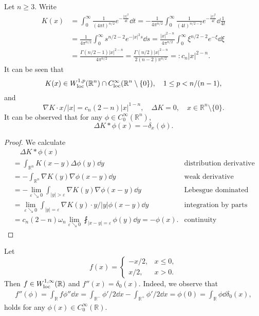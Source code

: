 \begin{proposition}
  Let $n\geq3$. 
  Write
  \begin{align*}
    K(x) &= \int_0^\infty\frac{1}{(4\pi t)^{n/2}}e^{-\frac{|x|^2}{4t}}\dd t 
    = - \frac{1}{4\pi^{n/2}}\int_0^\infty\frac{1}{(4t)^{n/2-2}}e^{-\frac{|x|^2}{4t}}\dd\frac1{4t}\\
    &= \frac1{4\pi^{n/2}}\int_0^\infty s^{n/2-2}e^{-|x|^2s}\dd s
    = \frac{|x|^{2-n}}{4\pi^{n/2}}\int_0^\infty \xi^{n/2-2}e^{-\xi}\dd\xi \\
    &= \frac{\Gamma(n/2-1)|x|^{2-n}}{4\pi^{n/2}} = \frac{\Gamma(n/2)|x|^{2-n}}{2(n-2)\pi^{n/2}} =: c_n|x|^{2-n}.
  \end{align*}
  It can be seen that 
  \[
  K(x) \in W_{\operatorname*{loc}}^{1,p}(\mathbb R^n)\cap C_{\operatorname*{loc}}^\infty(\mathbb R^n\setminus \{0\}),
  \quad 1\leq p < n/(n-1),
  \]
  and 
  \[
  \nabla K\cdot x/|x| = c_n(2-n)|x|^{1-n},\quad \Delta K = 0, \quad x\in  \mathbb R^n\setminus\{0\}.
  \]
  It can be observed that for any $\phi\in C_0^\infty(\mathbb R^n)$,
  \[
  \Delta K*\phi (x) = -\delta_x(\phi).
  \]
\end{proposition}

\begin{proof}
  We calculate 
  \begin{align*}
    &\quad\Delta K*\phi(x)\\
    &= \int_{\mathbb R^n}K(x-y)\Delta\phi(y)\dd y & \text{distribution derivative}\\ 
    &= -\int_{\mathbb R^n}\nabla K(y)\nabla\phi(x-y)\dd y
    & \text{weak derivative}\\
    &= - \lim_{\varepsilon\searrow0}\int_{|y|>\varepsilon}\nabla K(y)\nabla \phi(x-y)\dd y
    & \text{Lebesgue dominated convergence theorem}\\
    &= \lim_{\varepsilon\searrow0}\int_{|y|=\varepsilon}\nabla K(y)\cdot y/|y|\phi(x-y)\dd y
    & \text{integration by parts}\\
    &= c_n(2-n)\omega_n\lim_{\varepsilon\searrow0}\fint_{|x-y|=\varepsilon}\phi(y)\dd y
    = -\phi(x).
    & \text{continuity}
  \end{align*}
\end{proof}

\begin{remark}
  Let 
  \begin{equation*}
    f(x) = 
    \begin{cases}
      -x/2, & x\leq 0,\\
      x/2, & x>0.
    \end{cases}
  \end{equation*}
  Then $f\in W_{\operatorname*{loc}}^{1,\infty}(\mathbb R)$ and $f''(x) = \delta_0(x)$.
  Indeed,
  we observe that 
  \begin{align*}
    f''(\phi) = \int_{\mathbb R}  f\phi''\dd x 
    = \int_{\mathbb R^-}  \phi'/2\dd x - \int_{\mathbb R^+}\phi'/2\dd x 
    = \phi(0) = \int_{\mathbb R}\phi\dd\delta_0(x),
  \end{align*}
  holds for any $\phi(x)\in C^\infty_0(\mathbb R)$.
\end{remark}

